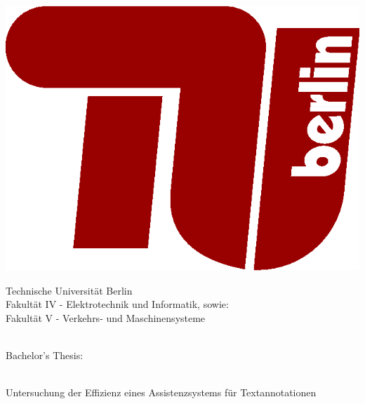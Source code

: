 \begin{titlepage}
	\centering
	\begin{minipage}{0.15\textwidth}
		\includegraphics[width=\textwidth]{assets/tu-berlin-logo.eps}
	\end{minipage}
	\hfill
	\begin{minipage}{0.80\textwidth}
		Technische Universität Berlin\\
		Fakultät IV - Elektrotechnik und Informatik, sowie:\\
		Fakultät V - Verkehrs- und Maschinensysteme
	\end{minipage}\ \\

	\vfill
	{\Large Bachelor’s Thesis:}\\
	\vspace{0.5cm}
	\begin{minipage}{0.9\textwidth}
		\centering
		{\Huge \thetitle} \\[0.25cm]
		Untersuchung der Effizienz eines Assistenzsystems für Textannotationen
	\end{minipage}\ \\

	\vfill


\end{titlepage}
